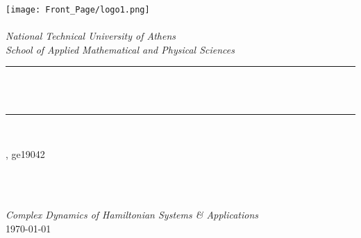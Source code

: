 \begin{titlepage}




\newcommand{\HRule}{\rule{\linewidth}{0.5mm}}
\texttt{[image: Front\_Page/logo1.png]}\\[1cm] 
\center 
\quad\\[1.5cm]
\textsl{\Large National Technical University of Athens}\\[0.5cm] 
\textsl{\large School of Applied Mathematical and Physical Sciences}\\[0.5cm] 
\makeatletter
\HRule \\[0.4cm]
{ \huge \bfseries \@title}\\[0.4cm] 
\HRule \\[1.5cm]
\begin{minipage}{0.4\textwidth}
\begin{flushleft} \large
\@author, ge19042
\end{flushleft}
\end{minipage}
~
\begin{minipage}{0.4\textwidth}
\begin{flushright} \large
\end{flushright}
\end{minipage}\\[3cm]
\makeatother
{\large \emph{Complex Dynamics of Hamiltonian Systems \& Applications}}\\[0.5cm]
{\large \today}\\[2cm] 
\vfill 



\end{titlepage}
